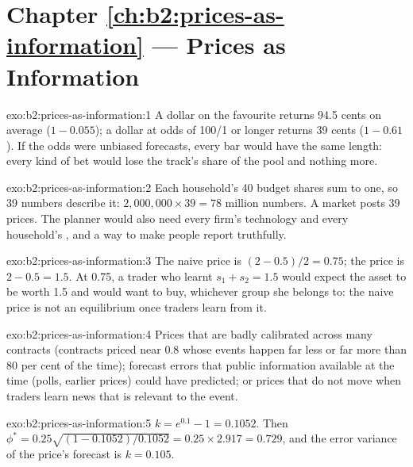 \section*{Chapter \ref{ch:b2:prices-as-information} --- Prices as Information}

\begin{solution}{exo:b2:prices-as-information:1}
A dollar on the favourite returns 94.5 cents on average ($1 - 0.055$); a dollar at odds of 100/1 or longer
returns 39 cents ($1 - 0.61$). If the odds were unbiased forecasts, every bar would have the same length:
every kind of bet would lose the track's share of the pool and nothing more.
\end{solution}

\begin{solution}{exo:b2:prices-as-information:2}
Each household's 40 budget shares sum to one, so 39 numbers describe it: $2{,}000{,}000 \times 39 = 78$
million numbers. A market posts 39 prices. The planner would also need every firm's technology and every
household's , and a way to make people report truthfully.
\end{solution}

\begin{solution}{exo:b2:prices-as-information:3}
The naive price is $(2 - 0.5)/2 = 0.75$; the  price is $2 - 0.5 = 1.5$. At 0.75, a trader who
learnt $s_1 + s_2 = 1.5$ would expect the asset to be worth 1.5 and would want to buy, whichever group she
belongs to: the naive price is not an equilibrium once traders learn from it.
\end{solution}

\begin{solution}{exo:b2:prices-as-information:4}
Prices that are badly calibrated across many contracts (contracts priced near 0.8 whose events happen far
less or far more than 80 per cent of the time); forecast errors that public information available at the
time (polls, earlier prices) could have predicted; or prices that do not move when traders learn news
that is relevant to the event.
\end{solution}

\begin{solution}{exo:b2:prices-as-information:5}
$k = e^{0.1} - 1 = 0.1052$. Then $\phi^* = 0.25\sqrt{(1 - 0.1052)/0.1052} = 0.25 \times 2.917 = 0.729$, and the
error variance of the price's forecast is $k = 0.105$.
\end{solution}

